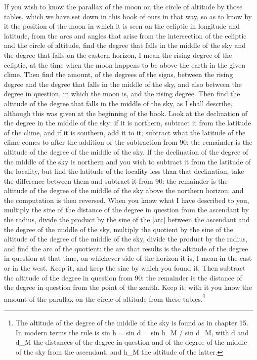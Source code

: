 \documentclass[11pt]{article}
\newcommand{\ArPage}[1]{\marginpar{\footnotesize\color{gray}Ar.\,p.\,#1}}
\begin{document}
\par \ArPage{119}If you wish to know the parallax of the moon on the circle of altitude by those tables, which we have set down in this book of ours in that way, so as to know by it the position of the moon in which it is seen on the ecliptic in longitude and latitude, from the arcs and angles that arise from the intersection of the ecliptic and the circle of altitude, find the degree that falls in the middle of the sky and the degree that falls on the eastern horizon, I mean the rising degree of the ecliptic, at the time when the moon happens to be above the earth in the given clime. Then find the amount, of the degrees of the signs, between the rising degree and the degree that falls in the middle of the sky, and also between the degree in question, in which the moon is, and the rising degree. Then find the altitude of the degree that falls in the middle of the sky, as I shall describe, although this was given at the beginning of the book. Look at the declination of the degree in the middle of the sky: if it is northern, subtract it from the latitude of the clime, and if it is southern, add it to it; subtract what the latitude of the clime comes to after the addition or the subtraction from 90: the remainder is the altitude of the degree of the middle of the sky. If the declination of the degree of the middle of the sky is northern and you wish to subtract it from the latitude of the locality, but find the latitude of the locality less than that declination, take the difference between them and subtract it from 90: the remainder is the altitude of the degree of the middle of the sky above the northern horizon, and the computation is then reversed. When you know what I have described to you, multiply the sine of the distance of the degree in question from the ascendant by the radius, divide the product by the sine of the [arc] between the ascendant and the degree of the middle of the sky, multiply the quotient by the sine of the altitude of the degree of the middle of the sky, divide the product by the radius, and find the arc of the quotient: the arc that results is the altitude of the degree in question at that time, on whichever side of the horizon it is, I mean in the east or in the west. Keep it, and keep the sine by which you found it. Then subtract the altitude of the degree in question from 90: the remainder is the distance of the degree in question from the point of the zenith. Keep it: with it you know the amount of the parallax on the circle of altitude from these tables.\footnote{The altitude of the degree of the middle of the sky is found as in chapter 15. In modern terms the rule is sin h = sin d · sin h\_M / sin d\_M, with d and d\_M the distances of the degree in question and of the degree of the middle of the sky from the ascendant, and h\_M the altitude of the latter.}\par
\end{document}
